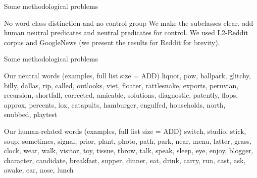 \documentclass[
  10pt,
  ignorenonframetext,
  x11names, dvipsnames, bibspacing,natbib, table]{beamer}
\begin{document}
\begin{frame}{Some methodological problems}
\protect\hypertarget{some-methodological-problems-1}{}
\begin{block}{No word class distinction and no control group}
\protect\hypertarget{no-word-class-distinction-and-no-control-group}{}
We make the subclasses clear, add human neutral predicates and neutral
predicates for control. We used L2-Reddit corpus and GoogleNews (we
present the results for Reddit for brevity).

\footnotesize 
\begin{table}

\caption{\label{tab:religionTableHeadLate}Rows from extended religion dataset.}
\centering
{}
\end{table}
\normalsize
\end{block}
\end{frame}

\begin{frame}{Some methodological problems}
\protect\hypertarget{some-methodological-problems-2}{}
\begin{block}{Our neutral words (examples, full list size = ADD)}
\protect\hypertarget{our-neutral-words-examples-full-list-size-add}{}
liquor, pow, ballpark, glitchy, billy, dallas, rip, called, outlooks,
viet, floater, rattlesnake, exports, peruvian, recursion, shortfall,
corrected, amicable, solutions, diagnostic, patently, flops, approx,
percents, lox, catapults, hamburger, engulfed, households, north,
snubbed, playtest
\end{block}

\begin{block}{Our human-related words (examples, full list size = ADD)}
\protect\hypertarget{our-human-related-words-examples-full-list-size-add}{}
switch, studio, stick, soup, sometimes, signal, prior, plant, photo,
path, park, near, menu, latter, grass, clock, wear, walk, visitor, toy,
tissue, throw, talk, speak, sleep, eye, enjoy, blogger, character,
candidate, breakfast, supper, dinner, eat, drink, carry, run, cast, ask,
awake, ear, nose, lunch
\end{block}
\end{frame}
\end{document}
